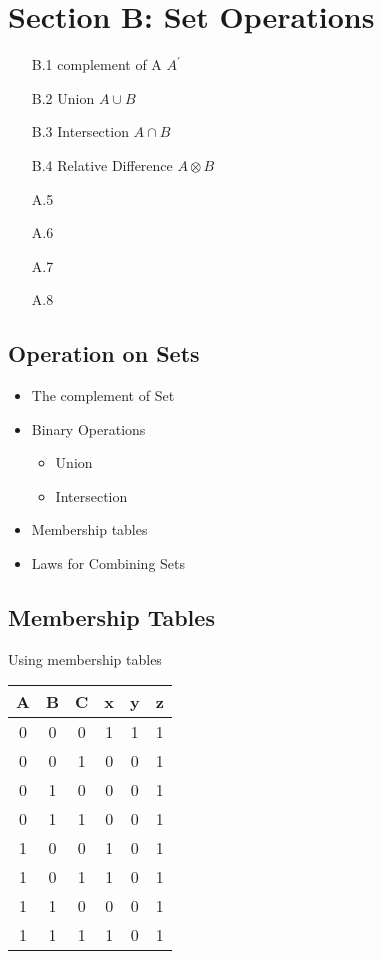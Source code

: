 \newpage
\section*{Section B: Set Operations}
\begin{itemize}
\item[B.1] complement of A $A^{\prime}$
\item[B.2] Union $A \cup B$
\item[B.3] Intersection $A \cap B$
\item[B.4] Relative Difference $A \otimes B$
\item[A.5]
\item[A.6]
\item[A.7]
\item[A.8]
\end{itemize}
\newpage


\subsection*{Operation on Sets}

\begin{itemize}
\item The complement of Set
\item Binary Operations
\begin{itemize}
\item Union
\item Intersection
\end{itemize}
\item Membership tables
\item Laws for Combining Sets
\end{itemize}
\subsection*{Membership Tables}
Using membership tables
\begin{tabular}{|ccc|c|c|c|}
\hline
A & B & C & x & y & z \\\hline
0 & 0 & 0 & 1 & 1 & 1 \\
0 & 0 & 1 & 0 & 0 & 1 \\
0 & 1 & 0 & 0 & 0 & 1 \\
0 & 1 & 1 & 0 & 0 & 1 \\
1 & 0 & 0 & 1 & 0 & 1 \\
1 & 0 & 1 & 1 & 0 & 1 \\
1 & 1 & 0 & 0 & 0 & 1 \\
1 & 1 & 1 & 1 & 0 & 1 \\
\hline
\end{tabular}


